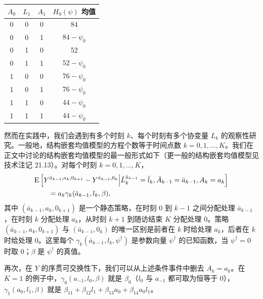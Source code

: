 \begin{finepoint}[用饱和结构嵌套模型做 g 估计]
\begin{center}
\begin{minipage}{0.92\textwidth}
\end{minipage}
\end{center}

\begin{center}
\begin{minipage}{0.92\textwidth}
\centering
{}
\label{tab:21.3}
\small
\begin{tabular}{cccc}
\toprule
$A_0$ & $L_1$ & $A_1$ & $H_0(\psi)$ 均值\\
\midrule
0 & 0 & 0 & 84\\
0 & 0 & 1 & $84-\psi_0$\\
0 & 1 & 0 & 52\\
0 & 1 & 1 & $52-\psi_0$\\
1 & 0 & 0 & $76-\psi_0$\\
1 & 0 & 1 & $76-\psi_0$\\
1 & 1 & 0 & $44-\psi_0$\\
1 & 1 & 1 & $44-\psi_0$\\
\bottomrule
\end{tabular}
\end{minipage}
\end{center}
\end{finepoint}
\renewcommand{\FPname}{精要}


然而在实践中，我们会遇到有多个时刻 $k$、每个时刻有多个协变量 $L_k$ 的观察性研究。一般地，结构嵌套均值模型的方程个数等于时间点数 $k=0,1,\dots,K$。我们在正文中讨论的结构嵌套均值模型的最一般形式如下（更一般的结构嵌套均值模型见技术注记 21.13）。对每个时刻 $k=0,1,\dots,K$，
\[
\begin{aligned}
&\mathrm{E}\left[Y^{\bar a_{k-1},a_k,0_{k+1}}-Y^{\bar a_{k-1},0_k}\Big|\bar L_k^{\bar a_{k-1}}=\bar l_k,\bar A_{k-1}=\bar a_{k-1},A_k=a_k\right]\\
&\qquad=a_k\gamma_k(\bar a_{k-1},l_k,\beta),
\end{aligned}
\]
其中 $(\bar a_{k-1},a_k,0_{k+1})$ 是一个静态策略，在时刻 0 到 $k-1$ 之间分配处理 $\bar a_{k-1}$，在时刻 $k$ 分配处理 $a_k$，从时刻 $k+1$ 到随访结束 $K$ 分配处理 0。策略 $(\bar a_{k-1},a_k,0_{k+1})$ 与 $(\bar a_{k-1},0_k)$ 的唯一区别是前者在 $k$ 时给处理 $a_k$，后者在 $k$ 时给处理 0。这里每个 $\gamma_k(\bar a_{k-1},l_k,\psi^\dagger)$ 是参数向量 $\psi^\dagger$ 的已知函数，当 $\psi^\dagger=0$ 时取 0；$\beta$ 是 $\psi^\dagger$ 的真值。

再次，在 $Y$ 的序贯可交换性下，我们可以从上述条件事件中删去 $A_k=a_k$。在 $K=1$ 的例子中，$\gamma_0(a_{-1},l_0,\beta)$ 就是 $\beta_0$（$l_0$ 与 $a_{-1}$ 都可取为恒等于 0），$\gamma_1(a_0,l_1,\beta)$ 就是 $\beta_{11}+\beta_{12}l_1+\beta_{13}a_0+\beta_{14}a_0l_1$。

